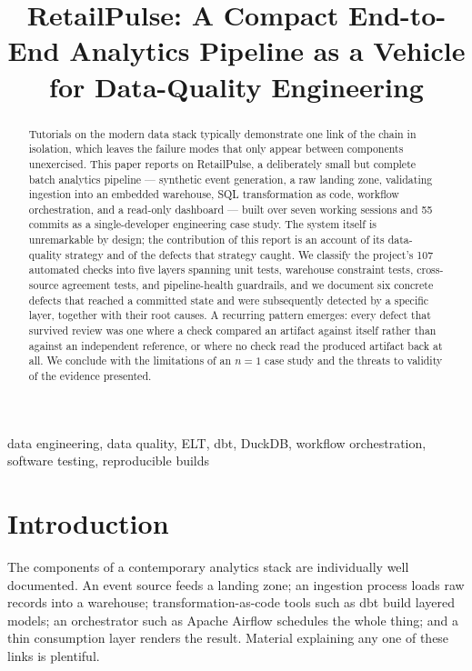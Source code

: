\documentclass[conference]{IEEEtran}
\begin{document}
\title{RetailPulse: A Compact End-to-End Analytics Pipeline as a Vehicle for
Data-Quality Engineering}

\author{
}

\maketitle

\begin{abstract}
Tutorials on the modern data stack typically demonstrate one link of the chain
in isolation, which leaves the failure modes that only appear between
components unexercised. This paper reports on RetailPulse, a deliberately small
but complete batch analytics pipeline --- synthetic event generation, a raw
landing zone, validating ingestion into an embedded warehouse, SQL
transformation as code, workflow orchestration, and a read-only dashboard ---
built over seven working sessions and 55 commits as a single-developer
engineering case study. The system itself is unremarkable by design; the
contribution of this report is an account of its data-quality strategy and of
the defects that strategy caught. We classify the project's 107 automated
checks into five layers spanning unit tests, warehouse constraint tests,
cross-source agreement tests, and pipeline-health guardrails, and we document
six concrete defects that reached a committed state and were subsequently
detected by a specific layer, together with their root causes. A recurring
pattern emerges: every defect that survived review was one where a check
compared an artifact against itself rather than against an independent
reference, or where no check read the produced artifact back at all. We
conclude with the limitations of an $n{=}1$ case study and the threats to
validity of the evidence presented.
\end{abstract}

\begin{IEEEkeywords}
data engineering, data quality, ELT, dbt, DuckDB, workflow orchestration,
software testing, reproducible builds
\end{IEEEkeywords}

\section{Introduction}

The components of a contemporary analytics stack are individually well
documented. An event source feeds a landing zone; an ingestion process loads
raw records into a warehouse; transformation-as-code tools such as dbt
\cite{dbt} build layered models; an orchestrator such as Apache Airflow
\cite{airflow} schedules the whole thing; and a thin consumption layer renders
the result. Material explaining any one of these links is plentiful.
\end{document}
